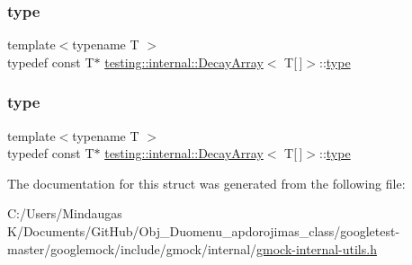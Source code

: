 \mbox{\label{structtesting_1_1internal_1_1_decay_array_3_01_t[]_4_a1820b673d104b3a985faaef8db5d77d2}} 
\subsubsection{\texorpdfstring{type}{type}\hspace{0.1cm}{\footnotesize\ttfamily [2/3]}}
{\footnotesize\ttfamily template$<$typename T $>$ \\
typedef const T$\ast$ \mbox{\hyperlink{structtesting_1_1internal_1_1_decay_array}{testing\+::internal\+::\+Decay\+Array}}$<$ T\mbox{[}$\,$\mbox{]}$>$\+::\mbox{\hyperlink{structtesting_1_1internal_1_1_decay_array_3_01_t[]_4_a1820b673d104b3a985faaef8db5d77d2}{type}}}

\mbox{\label{structtesting_1_1internal_1_1_decay_array_3_01_t[]_4_a1820b673d104b3a985faaef8db5d77d2}} 
\subsubsection{\texorpdfstring{type}{type}\hspace{0.1cm}{\footnotesize\ttfamily [3/3]}}
{\footnotesize\ttfamily template$<$typename T $>$ \\
typedef const T$\ast$ \mbox{\hyperlink{structtesting_1_1internal_1_1_decay_array}{testing\+::internal\+::\+Decay\+Array}}$<$ T\mbox{[}$\,$\mbox{]}$>$\+::\mbox{\hyperlink{structtesting_1_1internal_1_1_decay_array_3_01_t[]_4_a1820b673d104b3a985faaef8db5d77d2}{type}}}



The documentation for this struct was generated from the following file\+:\begin{DoxyCompactItemize}
\item 
C\+:/\+Users/\+Mindaugas K/\+Documents/\+Git\+Hub/\+Obj\+\_\+\+Duomenu\+\_\+apdorojimas\+\_\+class/googletest-\/master/googlemock/include/gmock/internal/\mbox{\hyperlink{googletest-master_2googlemock_2include_2gmock_2internal_2gmock-internal-utils_8h}{gmock-\/internal-\/utils.\+h}}\end{DoxyCompactItemize}
